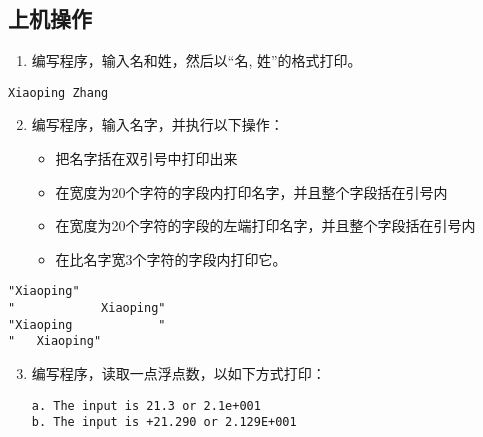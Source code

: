 \subsection{上机操作}

\begin{frame}[fragile]
\begin{enumerate}\setcounter{enumi}{0} 
\item 编写程序，输入名和姓，然后以“名, 姓”的格式打印。
\end{enumerate}

\begin{lstlisting}
Xiaoping Zhang
\end{lstlisting}
\end{frame}

\begin{frame}[fragile]

\end{frame}

\begin{frame}[fragile]
\begin{enumerate}\setcounter{enumi}{1} 
\item 编写程序，输入名字，并执行以下操作：\\[0.05in]
\begin{itemize}
\item 把名字括在双引号中打印出来\\[0.1in]
\item 在宽度为20个字符的字段内打印名字，并且整个字段括在引号内\\[0.1in]
\item 在宽度为20个字符的字段的左端打印名字，并且整个字段括在引号内\\[0.1in]
\item 在比名字宽3个字符的字段内打印它。
\end{itemize}
\end{enumerate}

\begin{lstlisting}[showspaces=true]
"Xiaoping"
"            Xiaoping"
"Xiaoping            "
"   Xiaoping"
\end{lstlisting}
\end{frame}

\begin{frame}[fragile]
\begin{enumerate}\setcounter{enumi}{2} 
\item 编写程序，读取一点浮点数，以如下方式打印：
\begin{lstlisting}[showspaces=true]
a. The input is 21.3 or 2.1e+001
b. The input is +21.290 or 2.129E+001
\end{lstlisting}
\end{enumerate}
\end{frame}


